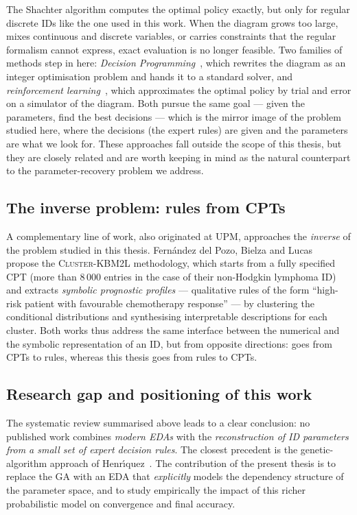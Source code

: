 The Shachter algorithm computes the optimal policy exactly, but only
for regular discrete IDs like the one used in this work. When the
diagram grows too large, mixes continuous and discrete variables, or
carries constraints that the regular formalism cannot express, exact
evaluation is no longer feasible. Two families of methods step in
here: \emph{Decision Programming}~\cite{salo2022decisionprog}, which
rewrites the diagram as an integer optimisation problem and hands it
to a standard solver, and \emph{reinforcement
learning}~\cite{gomez2024rl}, which approximates the optimal policy by
trial and error on a simulator of the diagram. Both pursue the same
goal — given the parameters, find the best decisions — which is the
mirror image of the problem studied here, where the decisions (the
expert rules) are given and the parameters are what we look for.
These approaches fall outside the scope of this thesis, but they are
closely related and are worth keeping in mind as the natural
counterpart to the parameter-recovery problem we address.


\subsection{The inverse problem: rules from CPTs}

A complementary line of work, also originated at UPM, approaches the \emph{inverse} of the problem studied in this thesis. Fern{\'a}ndez del Pozo, Bielza and Lucas~\cite{fdezdelpozo2010cluster} propose the
\textsc{Cluster-KBM2L} methodology, which starts from a fully
specified CPT (more than 8\,000 entries in the case of their
non-Hodgkin lymphoma ID) and extracts \emph{symbolic prognostic
profiles} — qualitative rules of the form ``high-risk patient with
favourable chemotherapy response'' — by clustering the conditional
distributions and synthesising interpretable descriptions for each
cluster. Both works thus address the same interface between the
numerical and the symbolic representation of an ID, but from
opposite directions: \cite{fdezdelpozo2010cluster} goes from CPTs
to rules, whereas this thesis goes from rules to CPTs.

\subsection{Research gap and positioning of this work}

The systematic review summarised above leads to a clear conclusion:
no published work combines \emph{modern EDAs} with the
\emph{reconstruction of ID parameters from a small set of expert
decision rules}. The closest precedent is the genetic-algorithm
approach of Henr{\'\i}quez~\cite{henriquez2024tfm}. The contribution
of the present thesis is to replace the GA with an EDA that
\emph{explicitly} models the dependency structure of the parameter
space, and to study empirically the impact of this richer
probabilistic model on convergence and final accuracy.


